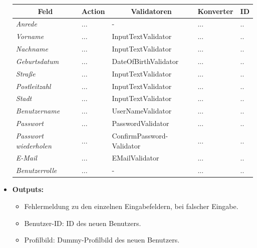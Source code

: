 \begin{itemize}
\begin{center}
\begin{longtable}{|p{3cm} |p{4cm} | p{4cm}|p{3cm} |p{2cm}|}
						\hline \multicolumn{1}{|c|}{\textbf{Feld}} & \multicolumn{1}{|c|}{\textbf{Action}} & \multicolumn{1}{|c|}{\textbf{Validatoren}}  &  \multicolumn{1}{|c|}{\textbf{Konverter}} &  \multicolumn{1}{|c|}{\textbf{ID}} \\ \hline
						\endfirsthead
						\hline
						\endlastfoot
						\textit{Anrede} & ... & - & ... & ..\\ \hline
						\textit{Vorname} & ... & InputTextValidator & ... & ..\\ \hline
						\textit{Nachname} & ... & InputTextValidator & ... & ..\\ \hline
						\textit{Geburtsdatum} & ... & DateOfBirthValidator & ... & ..\\ \hline
						\textit{Straße} & ... & InputTextValidator & ... & ..\\ \hline
						\textit{Postleitzahl} & ... & InputTextValidator & ... & ..\\ \hline	
						\textit{Stadt} & ... & InputTextValidator & ... & ..\\ \hline
						\textit{Benutzername} & ... & UserNameValidator & ... & ..\\ \hline	
						\textit{Passwort} & ... & PasswordValidator & ... & ..\\ \hline	
						\textit{Passwort wiederholen} & ... & ConfirmPassword-Validator & ... & ..\\ \hline
						\textit{E-Mail} & ... & EMailValidator & ... & ..\\ \hline
						\textit{Benutzerrolle} & ... & - & ... & ..\\ \hline
					\end{longtable}
				\end{center}
			\item \textbf{Outputs:}
			\begin{itemize}
				\item Fehlermeldung zu den einzelnen Eingabefeldern, bei falscher Eingabe.
				\item Benutzer-ID: ID des neuen Benutzers.
				\item Profilbild: Dummy-Profilbild des neuen Benutzers.
			\end{itemize}
					\begin{center}
						\begin{longtable}{|p{5cm} | p{4cm}|p{3cm}|}
							

\end{longtable}
\end{center}
\end{itemize}
